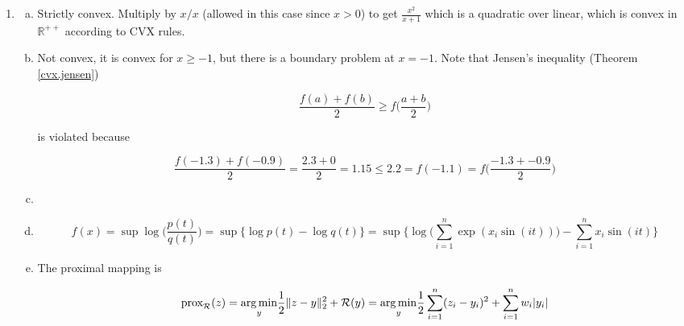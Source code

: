 \begin{enumerate}[(1)]

\item



\begin{enumerate}[(a)]

\item Strictly convex. Multiply by \(x/x\) (allowed in this case since \(x >0\)) to get \(\frac{x^2}{x+1}\) which is a quadratic over linear, which is convex in \(\mathbb{R}^{++}\) according to CVX rules.

\item Not convex, it is convex for \(x \geq -1\), but there is a boundary problem at \(x=-1\). Note that Jensen's inequality (Theorem \ref{cvx.jensen})

\[
\frac{f(a) + f(b)}{2} \geq f \bigg(\frac{a+b}{2} \bigg)
\]

is violated because

\[
\frac{f(-1.3) + f(-0.9)}{2} = \frac{2.3 + 0}{2} = 1.15  \leq 2.2 = f(-1.1) = f\bigg(\frac{-1.3 + -0.9}{2} \bigg) 
\]

\item 

%
%
%


\item 

\[
f(x) = \sup \log \bigg( \frac{p(t)}{q(t)} \bigg) = \sup \{ \log p(t) - \log q(t) \} = \sup \{ \log \bigg( \sum_{i=1}^n \exp(x_i \sin(i t)) \bigg) - \sum_{i=1}^n x_i \sin (i t) \}
\]

\item The proximal mapping is

\[
\text{prox}_\mathcal{R}(z) = \underset{y}{\operatorname*{arg\,min}} \frac{1}{2} \Vert z - y\rVert_2^2 + \mathcal{R}(y) = \underset{y}{\operatorname*{arg\,min}} \frac{1}{2}  \sum_{i=1}^n (z_i - y_i)^2  + \sum_{i=1}^n w_i |y_i|
\]


\end{enumerate}
\end{enumerate}
